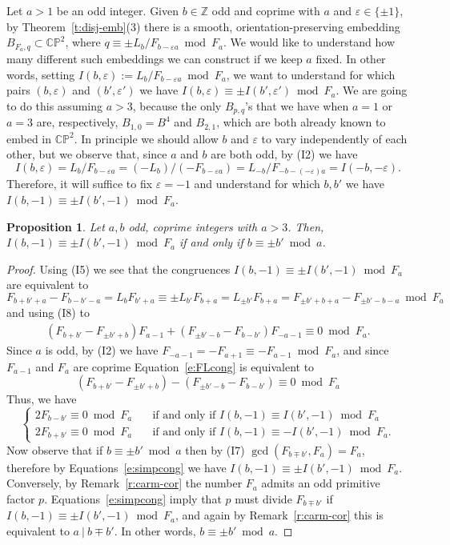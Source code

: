 \documentclass[11pt,a4paper]{amsart}
\newcommand{\CP}{\mathbb{CP}}
\newcommand{\Z}{\mathbb Z}
\newcommand{\ep}{\varepsilon}
\newtheorem{prop}[thm]{Proposition}
\theoremstyle{definition}
\numberwithin{equation}{section}
\begin{document}
Let $a>1$ be an odd integer. 
Given $b\in\Z$ odd and coprime with $a$ and $\ep\in\{\pm 1\}$, by Theorem~\ref{t:disj-emb}(3) there is a smooth, orientation-preserving embedding $B_{F_a,q}\subset\CP^2$, where $q\equiv \pm L_b/F_{b-\ep a}\bmod F_a$. 
We would like to understand how many different such embeddings we can construct if we keep $a$ fixed. 
In other words, setting $I(b,\ep):=L_b/F_{b-\ep a} \bmod F_a$, we want to understand for which pairs $(b,\ep)$ and $(b',\ep')$ we have $I(b,\ep)\equiv \pm I(b',\ep')\bmod F_a$.
We are going to do this assuming $a>3$, because the only $B_{p,q}$'s that we have when $a=1$ or $a=3$ are, respectively, $B_{1,0}=B^4$ and $B_{2,1}$, which are both already known to embed in $\CP^2$.
In principle  we should allow $b$ and $\ep$ to vary independently of each other, but we observe that, since $a$ and $b$ are both odd, by 
(I2) we have 
\[
I(b,\ep) = L_b/F_{b-\ep a} = (-L_b)/(-F_{b-\ep a}) = L_{-b}/F_{-b-(-\ep)a} = I(-b,-\ep).
\]
Therefore, it will suffice to fix $\ep=-1$ and understand for which $b,b'$ we have $I(b,-1)\equiv\pm I(b',-1)\bmod F_a$.

\begin{prop}\label{p:I(b,ep)}
Let $a,b$ odd, coprime integers with $a>3$. Then, 
$I(b,-1)\equiv\pm I(b',-1)\bmod F_a$ if and only if $b \equiv \pm b'\bmod a$. 
\end{prop} 

\begin{proof} 
Using (I5) we see that the congruences $I(b,-1)\equiv\pm I(b',-1)\bmod F_a$ are equivalent to 
\[
F_{b+b'+a} - F_{b-b'-a} = L_b F_{b'+a} \equiv 
\pm L_{b'} F_{b+a} = L_{\pm b'}F_{b+a} =F_{\pm b'+b+a} - F_{\pm b'-b-a}\bmod F_a
\]
and using (I8) to 
\begin{equation}\label{e:FLcong}
\begin{split}
(F_{b+b'} - F_{\pm b'+b}) F_{a-1} 
+  (F_{\pm b'-b} - F_{b-b'}) F_{-a -1}
\equiv 
0\bmod F_a.
\end{split}
\end{equation} 
Since $a$ is odd, by (I2) we have $F_{-a-1}=-F_{a+1} \equiv -F_{a-1} \bmod F_a$,  
and since $F_{a-1}$ and $F_a$ are coprime Equation~\eqref{e:FLcong} is equivalent to 
\[
(F_{b+b'} - F_{\pm b'+b}) 
-  (F_{\pm b'-b} - F_{b-b'}) \equiv 0 \bmod F_a
\]
Thus, we have 
\begin{equation}\label{e:simpcong}
\begin{cases}
2F_{b-b'} \equiv 0 \bmod F_a & \quad \text{if and only if $I(b,-1)\equiv I(b',-1)\bmod F_a$}\\
2F_{b+b'} \equiv 0 \bmod F_a & \quad \text{if and only if $I(b,-1)\equiv -I(b',-1)\bmod F_a$.}
\end{cases}
\end{equation} 
Now observe that if $b \equiv \pm b' \bmod a$ then by (I7) 
$\gcd(F_{b\mp b'},F_a) = F_a$, therefore by Equations~\eqref{e:simpcong} 
we have $I(b,-1)\equiv \pm I(b',-1)\bmod F_a$. Conversely, by 
Remark~\ref{r:carm-cor} the number $F_a$ admits an odd primitive factor $p$. 
Equations~\eqref{e:simpcong} imply that $p$ must divide $F_{b \mp b'}$ if 
$I(b,-1)\equiv \pm I(b',-1)\bmod F_a$, and again by Remark~\ref{r:carm-cor}
this is equivalent to $a\ |\ b \mp b'$. In other words, $b \equiv \pm b' \bmod a$.
\end{proof} 
\end{document}
